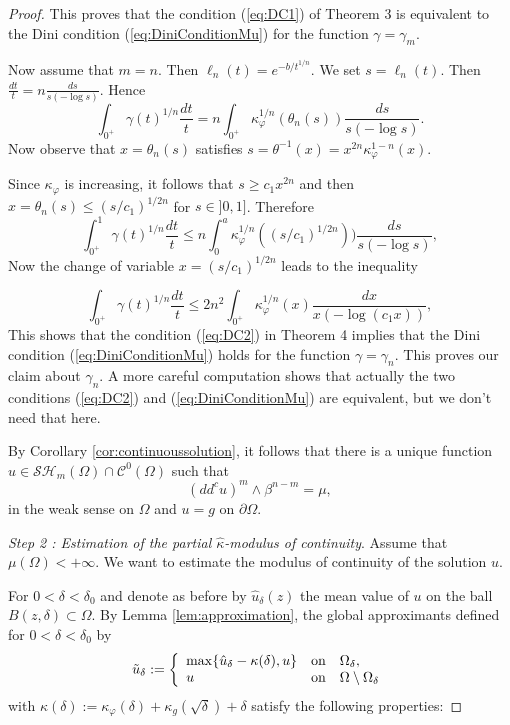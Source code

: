 \documentclass[12pt]{amsart}
\theoremstyle{definition}
\numberwithin{theorem}{section}
\numberwithin{equation}{section}
\begin{document}
{\begin{proof}
This proves that the condition (\ref{eq:DC1})  of Theorem 3 is equivalent to  the Dini condition (\ref{eq:DiniConditionMu}) for the function $\gamma = \gamma_m$.

Now assume that $m = n$. Then $\ell_n (t) = e^{-b \slash t^{1\slash n}}$. We set $s = \ell_n (t)$. Then 
$\frac{d t}{t} = n \frac{d s}{s (-\log s)}$. Hence
$$
\int_{0^+} \gamma (t)^{1 \slash n} \frac{d t}{t} =  n \int_{0^+} \kappa_\varphi^{1 \slash n} (\theta_n (s)) \frac{d s}{s (-\log s)}.
$$
Now observe that $x = \theta_n (s)$ satisfies $s = \theta^{-1} (x) = x^{2 n} \kappa_\varphi^{1 - n} (x)$.

Since $\kappa_\varphi$ is increasing, it follows that  $s \geq c_1 x^{2n}$ and then $ x = \theta_n (s) \leq (s \slash c_1)^{1 \slash 2 n}$ for $s \in ]0,1]$. Therefore
$$
\int_{0^+}^1 \gamma (t)^{1 \slash n} \frac{d t}{t}  \leq  n \int_{0}^{a} \kappa_\varphi^{1 \slash n}  ((s\slash c_1)^{1 \slash 2 n})) \frac{d s}{s (-\log s)},
$$
Now the change of variable $x = (s\slash c_1)^{1 \slash 2 n}$ leads to the inequality

$$
\int_{0^+} \gamma (t)^{1 \slash n} \frac{d t}{t}   \leq  2 n^2 \int_{0^+} \kappa_\varphi^{1 \slash n}  (x) \frac{d x}{ x  (-\log (c_1 x))},
$$  
This shows that the condition (\ref{eq:DC2}) in Theorem 4 implies that the  Dini condition (\ref{eq:DiniConditionMu}) holds for the function $\gamma = \gamma_n$.
This proves our claim about $\gamma_n$. A more careful computation shows that actually the two conditions  (\ref{eq:DC2})  and  (\ref{eq:DiniConditionMu})  are equivalent, but we don't need that here.

 By Corollary \ref{cor:continuoussolution}, it follows that there is a unique function $u\in \mathcal{SH}_m(\Omega)\cap \mathcal{C}^{0}({\Omega}) $ such that 
$$ 
(dd^c u)^m\wedge\beta^{n-m}=\mu,
$$
in the weak sense on $\Omega$ and $ u=g $ on $\partial\Omega$.

\smallskip


{\it Step 2 : Estimation of the partial $\widehat{\kappa}$-modulus of continuity}. 
Assume that $\mu (\Omega) < + \infty$. We want to estimate the modulus of continuity of the solution $u$.

For  $0 < \delta < \delta_0$ and  denote as before by 
 $\widehat{u}_{\delta}(z)$ the mean value  of $u$ on the ball $B (z,\delta) \subset \Omega$.
By Lemma \ref{lem:approximation}, the global approximants  defined for $0 < \delta < \delta_0$ by  
$$
 \tilde{u}_{\delta}:= \left\{ \begin{array}{lcl}
\max\{\hat{u}_{\delta} -  \kappa (\delta),u \} &\hbox{on} & \Omega_{\delta}, \\
u  &\hbox{on} & \Omega\setminus\Omega_{\delta}
\end{array}\right.
$$
with $\kappa (\delta) :=  \kappa_\varphi (\delta) + \kappa_g (\sqrt{\delta}) + \delta$ satisfy the following properties:


\end{proof}}
\end{document}
